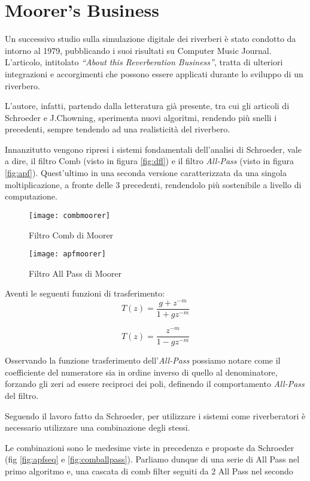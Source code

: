 \section{Moorer's Business}

Un successivo studio sulla simulazione digitale dei riverberi è stato condotto
da \jam~ intorno al 1979, pubblicando i suoi risultati su Computer Music Journal.
L’articolo, intitolato \emph{“About this Reverberation Business”}, tratta di
ulteriori integrazioni e accorgimenti che possono essere applicati durante lo
sviluppo di un riverbero.

L’autore, infatti, partendo dalla letteratura già presente, tra cui gli articoli
di Schroeder e J.Chowning, sperimenta nuovi algoritmi, rendendo più snelli i
precedenti, sempre tendendo ad una realisticità del riverbero.

Innanzitutto vengono ripresi i sistemi fondamentali dell’analisi di Schroeder,
vale a dire, il filtro Comb (visto in figura \ref{fig:dfl}) e il filtro
\emph{All-Pass} (visto in figura \ref{fig:apf}). Quest’ultimo in una seconda
versione caratterizzata da una singola moltiplicazione, a fronte delle 3
precedenti, rendendolo più sostenibile a livello di computazione.

\begin{figure}[htp]
\centering
\texttt{[image: combmoorer]}
\caption{Filtro Comb di Moorer}
\label{fig:combmoorer}
\texttt{[image: apfmoorer]}
\caption{Filtro All Pass di Moorer}
\label{fig:apfmoorer}
\end{figure}

Aventi le seguenti funzioni di trasferimento:
\begin{equation}
T(z) = \frac{g + z^{-m}}{1+gz^{-m}}
\end{equation}

\begin{equation}
T(z) = \frac{z^{-m}}{1-gz^{-m}}
\end{equation}

Osservando la funzione trasferimento dell’\emph{All-Pass} possiamo notare come
il coefficiente del numeratore sia in ordine inverso di quello al denominatore,
forzando gli zeri ad essere reciproci dei poli, definendo il comportamento
\emph{All-Pass} del filtro.

Seguendo il lavoro fatto da Schroeder, per utilizzare i sistemi come
riverberatori è necessario utilizzare una combinazione degli stessi.

Le combinazioni sono le medesime viste in precedenza e proposte da Schroeder
(fig \ref{fig:apfseq} e \ref{fig:comballpass}). Parliamo dunque di una serie di
All Pass nel primo algoritmo e, una cascata di comb filter seguiti da 2 All Pass
nel secondo

